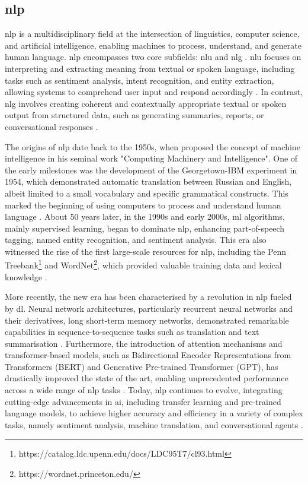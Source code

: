\subsection{\acl{nlp}} \label{subsec:nlp}

\ac{nlp} is a multidisciplinary field at the intersection of linguistics, computer science, and artificial intelligence, enabling machines to process, understand, and generate human language. \ac{nlp} encompasses two core subfields: \ac{nlu} and \ac{nlg} \cite{Khurana2023}. \ac{nlu} focuses on interpreting and extracting meaning from textual or spoken language, including tasks such as sentiment analysis, intent recognition, and entity extraction, allowing systems to comprehend user input and respond accordingly \cite{Khurana2023}. In contrast, \ac{nlg} involves creating coherent and contextually appropriate textual or spoken output from structured data, such as generating summaries, reports, or conversational responses \cite{Dong2021}.

The origins of \ac{nlp} date back to the 1950s, when  proposed the concept of machine intelligence in his seminal work "Computing Machinery and Intelligence". One of the early milestones was the development of the Georgetown-IBM experiment in 1954, which demonstrated automatic translation between Russian and English, albeit limited to a small vocabulary and specific grammatical constructs. This marked the beginning of using computers to process and understand human language \cite{Hutchins2004}. About 50 years later, in the 1990s and early 2000s, \ac{ml} algorithms, mainly supervised learning, began to dominate \ac{nlp}, enhancing part-of-speech tagging, named entity recognition, and sentiment analysis. This era also witnessed the rise of the first large-scale resources for \ac{nlp}, including the Penn Treebank\footnote{https://catalog.ldc.upenn.edu/docs/LDC95T7/cl93.html} and WordNet\footnote{https://wordnet.princeton.edu/}, which provided valuable training data and lexical knowledge \cite{Marcus1993, Fellbaum1998}.

More recently, the new era has been characterised by a revolution in \ac{nlp} fueled by \ac{dl}. Neural network architectures, particularly recurrent neural networks and their derivatives, long short-term memory networks, demonstrated remarkable capabilities in sequence-to-sequence tasks such as translation and text summarisation \cite{Bahdanau2015}. Furthermore, the introduction of attention mechanisms and transformer-based models, such as Bidirectional Encoder Representations from Transformers (BERT) and Generative Pre-trained Transformer (GPT), has drastically improved the state of the art, enabling unprecedented performance across a wide range of \ac{nlp} tasks \cite{Vaswani2017, Devlin2019}. Today, \ac{nlp} continues to evolve, integrating cutting-edge advancements in \ac{ai}, including transfer learning and pre-trained language models, to achieve higher accuracy and efficiency in a variety of complex tasks, namely sentiment analysis, machine translation, and conversational agents \cite{Howard2018}.

